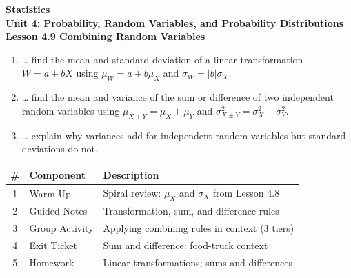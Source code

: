 \documentclass[10pt]{article}
\begin{document}
\vspace{-0.8in}

\begin{center}
  {\color{white}\textbf{\LARGE Statistics}}\\[4pt]
  {\color{skymid}\large\textbf{Unit 4: Probability, Random Variables, and Probability Distributions}}\\[6pt]
  {\color{white}\textbf{\large Lesson 4.9 \quad Combining Random Variables}}
\end{center}

\vspace{0.22in}
\namedateperiod
\vspace{0.18in}

\begin{learningtargetbox}
\small
\begin{enumerate}[leftmargin=1.5em, itemsep=5pt]
  \item \ldots{} find the mean and standard deviation of a linear transformation
        $W = a + bX$ using $\mu_W = a + b\mu_X$ and $\sigma_W = |b|\sigma_X$.
  \item \ldots{} find the mean and variance of the sum or difference of two independent
        random variables using $\mu_{X \pm Y} = \mu_X \pm \mu_Y$ and
        $\sigma^2_{X \pm Y} = \sigma^2_X + \sigma^2_Y$.
  \item \ldots{} explain why variances add for independent random variables but
        standard deviations do not.
\end{enumerate}
\end{learningtargetbox}

\vspace{0.14in}

\begin{tocbox}
\small
\renewcommand{\arraystretch}{1.5}
\begin{tabularx}{\linewidth}{@{} c l X @{}}
\rowcolor{sky}
\textbf{\#} & \textbf{Component} & \textbf{Description} \\
\midrule
1 & Warm-Up        & Spiral review: $\mu_X$ and $\sigma_X$ from Lesson 4.8 \\
2 & Guided Notes   & Transformation, sum, and difference rules \\
3 & Group Activity & Applying combining rules in context (3 tiers) \\
4 & Exit Ticket    & Sum and difference: food-truck context \\
5 & Homework       & Linear transformations; sums and differences \\
\end{tabularx}
\end{tocbox}
\end{document}
